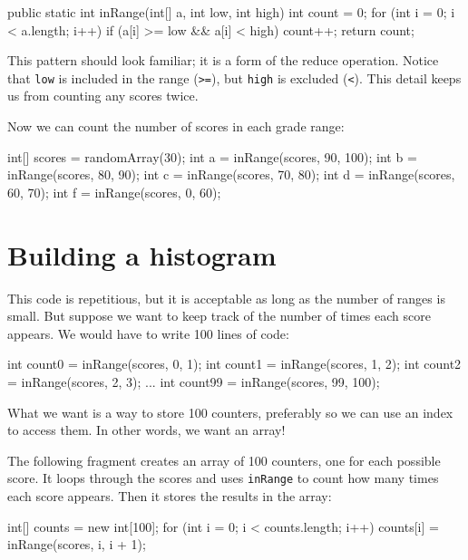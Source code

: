 \documentclass[12pt]{book}
\theoremstyle{exercise}
\newcommand{\java}[1]{\verb"#1"}
\begin{document}
\begin{code}
public static int inRange(int[] a, int low, int high) {
    int count = 0;
    for (int i = 0; i < a.length; i++) {
        if (a[i] >= low && a[i] < high) {
            count++;
        }
    }
    return count;
}
\end{code}

This pattern should look familiar; it is a form of the reduce operation.
Notice that \java{low} is included in the range (\java{>=}), but \java{high} is excluded (\java{<}).
This detail keeps us from counting any scores twice.

Now we can count the number of scores in each grade range:

\begin{code}
    int[] scores = randomArray(30);
    int a = inRange(scores, 90, 100);
    int b = inRange(scores, 80, 90);
    int c = inRange(scores, 70, 80);
    int d = inRange(scores, 60, 70);
    int f = inRange(scores, 0, 60);
\end{code}


\section{Building a histogram}

This code is repetitious, but it is acceptable as long as the number of ranges is small.
But suppose we want to keep track of the number of times each score appears.
We would have to write 100 lines of code:

\begin{code}
    int count0 = inRange(scores, 0, 1);
    int count1 = inRange(scores, 1, 2);
    int count2 = inRange(scores, 2, 3);
    ...
    int count99 = inRange(scores, 99, 100);
\end{code}

What we want is a way to store 100 counters, preferably so we can use an index to access them.
In other words, we want an array!

The following fragment creates an array of 100 counters, one for each possible score.
It loops through the scores and uses \java{inRange} to count how many times each score appears.
Then it stores the results in the array:

\begin{code}
    int[] counts = new int[100];
    for (int i = 0; i < counts.length; i++) {
        counts[i] = inRange(scores, i, i + 1);
    }
\end{code}
\end{document}
